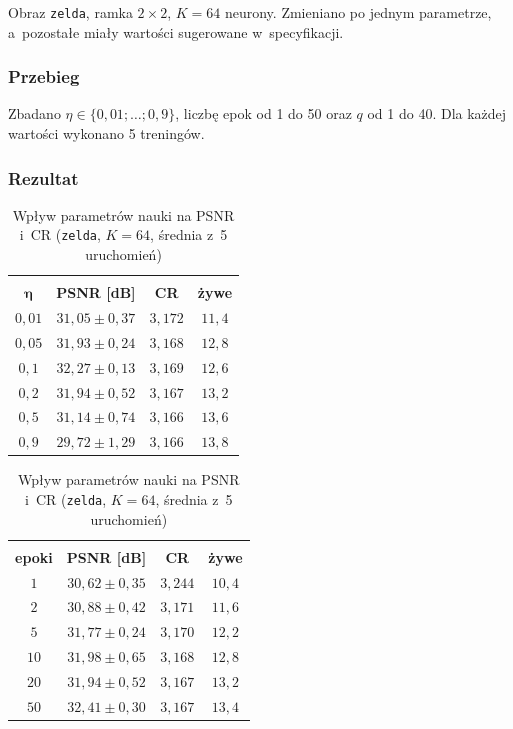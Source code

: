 \documentclass[12pt]{article}
\begin{document}
Obraz \texttt{zelda}, ramka $2\times2$, $K=64$ neurony. Zmieniano po jednym parametrze, a~pozostałe
miały wartości sugerowane w~specyfikacji.

\subsubsection{Przebieg}

Zbadano $\eta\in\{0{,}01;\dots;0{,}9\}$, liczbę epok od 1 do 50 oraz $q$ od 1 do 40. Dla każdej
wartości wykonano 5 treningów.

\subsubsection{Rezultat}

\begin{table}[h!]
 \caption{Wpływ parametrów nauki na PSNR i~CR (\texttt{zelda}, $K=64$, średnia z~5 uruchomień)}
 \centering
 \small
 \vspace{0.2cm}
 \begin{tabular}{c c c c}
  \hline\hline\\[-0.4cm]
  $\boldsymbol{\eta}$ & \textbf{PSNR [dB]} & \textbf{CR} & \textbf{żywe}\\[0.1cm]
  \hline
  $0{,}01$ & $31{,}05\pm0{,}37$ & $3{,}172$ & $11{,}4$ \\
  $0{,}05$ & $31{,}93\pm0{,}24$ & $3{,}168$ & $12{,}8$ \\
  $0{,}1$ & $32{,}27\pm0{,}13$ & $3{,}169$ & $12{,}6$ \\
  $0{,}2$ & $31{,}94\pm0{,}52$ & $3{,}167$ & $13{,}2$ \\
  $0{,}5$ & $31{,}14\pm0{,}74$ & $3{,}166$ & $13{,}6$ \\
  $0{,}9$ & $29{,}72\pm1{,}29$ & $3{,}166$ & $13{,}8$ \\
  \hline
 \end{tabular}\hspace{0.4cm}
 \begin{tabular}{c c c c}
  \hline\hline\\[-0.4cm]
  \textbf{epoki} & \textbf{PSNR [dB]} & \textbf{CR} & \textbf{żywe}\\[0.1cm]
  \hline
  $1$ & $30{,}62\pm0{,}35$ & $3{,}244$ & $10{,}4$ \\
  $2$ & $30{,}88\pm0{,}42$ & $3{,}171$ & $11{,}6$ \\
  $5$ & $31{,}77\pm0{,}24$ & $3{,}170$ & $12{,}2$ \\
  $10$ & $31{,}98\pm0{,}65$ & $3{,}168$ & $12{,}8$ \\
  $20$ & $31{,}94\pm0{,}52$ & $3{,}167$ & $13{,}2$ \\
  $50$ & $32{,}41\pm0{,}30$ & $3{,}167$ & $13{,}4$ \\
  \hline
 \end{tabular}


\end{table}
\end{document}
